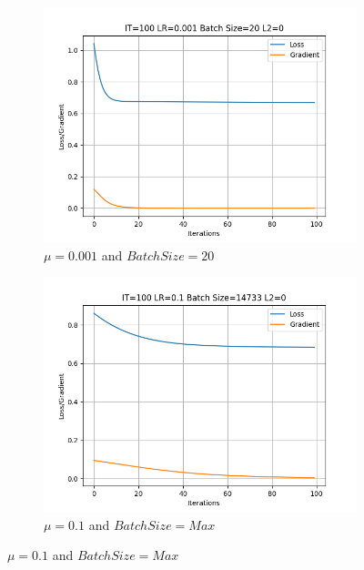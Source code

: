 \documentclass[
	letterpaper, %
	10pt, %
]{class}
\begin{document}
\begin{figure}[!h]
    \centering
    \begin{subfigure}{0.49\textwidth}
        \centering
        \includegraphics[width = \textwidth]{../images/graph_1.png}
        \caption{$\mu = 0.001$ and $Batch Size = 20$}
        \label{fig:left}
    \end{subfigure}
    \begin{subfigure}{0.49\textwidth}
        \centering
        \includegraphics[width = \textwidth]{../images/graph_2.png}
        \caption{$\mu = 0.1 $ and $Batch Size = Max$}
        \label{fig:right}
    \end{subfigure}
    \label{fig:combined}
\end{figure}
\end{document}
